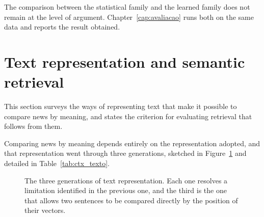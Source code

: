 The comparison between the statistical family and the learned family does not remain at the level
of argument. Chapter~\ref{cap:avaliacao} runs both on the same data and reports the result
obtained.

\section{Text representation and semantic retrieval}
\label{sec:ctx_texto}

This section surveys the ways of representing text that make it possible to compare news by
meaning, and states the criterion for evaluating retrieval that follows from them.

Comparing news by meaning depends entirely on the representation adopted, and that representation
went through three generations, sketched in Figure~\ref{fig:ctx_geracoes} and detailed in
Table~\ref{tab:ctx_texto}.

\begin{figure}[htbp]
\centering
{}
\caption[Three generations of text representation]{The three generations of text representation.
Each one resolves a limitation identified in the previous one, and the third is the one that allows
two sentences to be compared directly by the position of their vectors.}
\label{fig:ctx_geracoes}
\end{figure}

